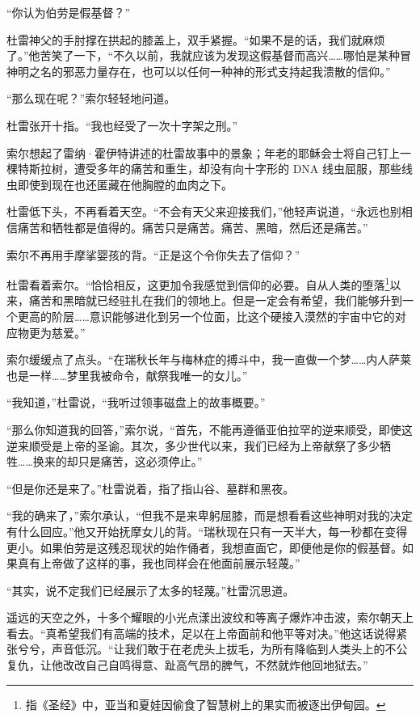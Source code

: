 \documentclass[AutoFakeBold=true]{book}
\begin{document}
``你认为伯劳是假基督？''

杜雷神父的手肘撑在拱起的膝盖上，双手紧握。``如果不是的话，我们就麻烦了。''他苦笑了一下，``不久以前，我就应该为发现这假基督而高兴……哪怕是某种冒神明之名的邪恶力量存在，也可以以任何一种神的形式支持起我溃散的信仰。''

``那么现在呢？''索尔轻轻地问道。

杜雷张开十指。``我也经受了一次十字架之刑。''

索尔想起了雷纳·霍伊特讲述的杜雷故事中的景象；年老的耶稣会士将自己钉上一棵特斯拉树，遭受多年的痛苦和重生，却没有向十字形的 DNA 线虫屈服，那些线虫即使到现在也还匿藏在他胸膛的血肉之下。

杜雷低下头，不再看着天空。``不会有天父来迎接我们，''他轻声说道，``永远也别相信痛苦和牺牲都是值得的。痛苦只是痛苦。痛苦、黑暗，然后还是痛苦。''

索尔不再用手摩挲婴孩的背。``正是这个令你失去了信仰？''

杜雷看着索尔。``恰恰相反，这更加令我感觉到信仰的必要。自从人类的堕落\footnote{指《圣经》中，亚当和夏娃因偷食了智慧树上的果实而被逐出伊甸园。}以来，痛苦和黑暗就已经驻扎在我们的领地上。但是一定会有希望，我们能够升到一个更高的阶层……意识能够进化到另一个位面，比这个硬接入漠然的宇宙中它的对应物更为慈爱。''

索尔缓缓点了点头。``在瑞秋长年与梅林症的搏斗中，我一直做一个梦……内人萨莱也是一样……梦里我被命令，献祭我唯一的女儿。''

``我知道，''杜雷说，``我听过领事磁盘上的故事概要。''

``那么你知道我的回答，''索尔说，``首先，不能再遵循亚伯拉罕的逆来顺受，即使这逆来顺受是上帝的圣谕。其次，多少世代以来，我们已经为上帝献祭了多少牺牲……换来的却只是痛苦，这必须停止。''

``但是你还是来了。''杜雷说着，指了指山谷、墓群和黑夜。

``我的确来了，''索尔承认，``但我不是来卑躬屈膝，而是想看看这些神明对我的决定有什么回应。''他又开始抚摩女儿的背。``瑞秋现在只有一天半大，每一秒都在变得更小。如果伯劳是这残忍现状的始作俑者，我想直面它，即便他是你的假基督。如果真有上帝做了这样的事，我也同样会在他面前展示轻蔑。''

``其实，说不定我们已经展示了太多的轻蔑。''杜雷沉思道。

遥远的天空之外，十多个耀眼的小光点漾出波纹和等离子爆炸冲击波，索尔朝天上看去。``真希望我们有高端的技术，足以在上帝面前和他平等对决。''他这话说得紧张兮兮，声音低沉。``让我们敢于在老虎头上拔毛，为所有降临到人类头上的不公复仇，让他改改自己自鸣得意、趾高气昂的脾气，不然就炸他回地狱去。''
\end{document}
